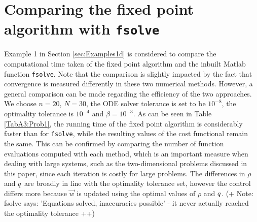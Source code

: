 \section{Comparing the fixed point algorithm with \texttt{fsolve}}
\label{app:fsolveComparison}

Example 1 in Section \ref{sec:Examples1d} is considered to compare the computational time taken of the fixed point algorithm and the inbuilt Matlab function \texttt{fsolve}. Note that the comparison is slightly impacted by the fact that convergence is measured differently in these two numerical methods. However, a general comparison can be made regarding the efficiency of the two approaches.
We choose $n=20$, $N=30$, the ODE solver tolerance is set to be $10^{-8}$, the optimality tolerance is $10^{-4}$ and $\beta = 10^{-3}$. 
As can be seen in Table \ref{TabA3:Prob1}, the running time of the fixed point algorithm is considerably faster than for \texttt{fsolve}, while the resulting values of the cost functional remain the same. This can be confirmed by comparing the number of function evaluations computed with each method, which is an important measure when dealing with large systems, such as the two-dimensional problems discussed in this paper, since each iteration is costly for large problems. The differences in $\rho$ and $q$ are broadly in line with the optimality tolerance set, however the control differs more because $\vec{w}$ is updated using the optimal values of $\rho$ and $q$. (+ Note: fsolve says: 'Equations solved, inaccuracies possible' - it never actually reached the optimality tolerance ++)

